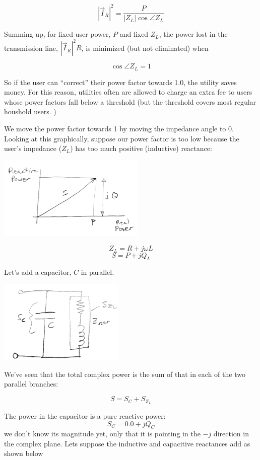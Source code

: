 \[
|\vec{I}_R|^2 = \frac{P}{|Z_L| \cos \angle Z_L}
\]

Summing up, for fixed user power, $P$ and fixed $Z_L$, the power lost in
the transmission line, $|\vec{I}_R|^2 R$, is minimized (but not eliminated) when

\[
\cos \angle Z_L = 1
\]

So if the user can ``correct'' their power factor towards 1.0,
the utility saves money.
For this reason, utilities often are allowed to charge
an extra fee to users whose power factors fall below a  threshold (but the
threshold covers most regular houshold users. )

We move the power factor towards 1 by moving the
impedance angle to 0.
Looking at this graphically, suppose our power factor is too low because
the user's impedance ($Z_L$) has too much positive (inductive) reactance:

\vspace{0.15in}
\includegraphics[width=70mm]{figsChapt03/KM41864.png}

\[
Z_L = R + j\omega L
\]
\[
S = P + jQ_L
\]



Let's add a capacitor, $ C$  in parallel.

\vspace{0.1in}
\includegraphics[width=60mm]{figsChapt03/ID44718.png}
\vspace{0.1in}

We've seen that the total complex
power is the sum of that in each of the two parallel branches:

\[
S = S_C + S_{Z_L}
\]

The power in the capacitor is a pure reactive power:
\[
S_C = 0.0 + j Q_C
\]
we don't know its magnitude yet, only that it is pointing in the $-j$ direction
in the complex plane.   Lets suppose the inductive and capacitive reactances add
as shown below

